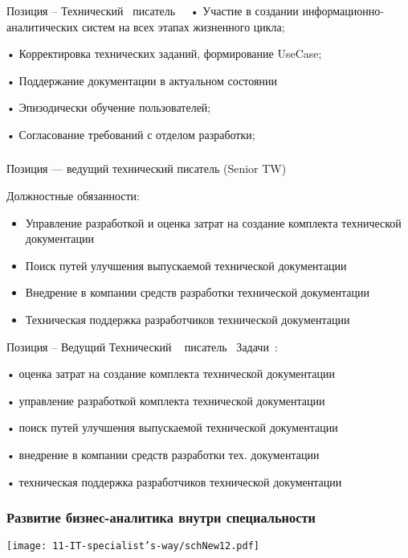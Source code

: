 \documentclass{../industrial-development}
\begin{document}
\lecturenotes

Позиция –  Технический~\cite{hh} писатель~\cite{itcf}~\cite{rab}
•	Участие в создании информационно-аналитических систем на всех этапах жизненного цикла;

•	Корректировка технических заданий, формирование UseCase;

•	Поддержание документации в актуальном состоянии

•	Эпизодически обучение пользователей;

•	Согласование требований с отделом разработки;

\begin{frame} \frametitle{}
  \begin{block}{}
  \alert{Позиция --- ведущий технический писатель (Senior TW) }

Должностные обязанности: 
  \end{block}
  \begin{itemize}
  \item Управление разработкой и оценка затрат на создание комплекта технической документации
  \item Поиск путей улучшения выпускаемой технической документации
  \item Внедрение в компании средств разработки технической документации
 \item 	 Техническая поддержка разработчиков технической документации
  \end{itemize}
\end{frame}

\lecturenotes

Позиция – Ведущий Технический ~\cite{hh} писатель~\cite{itcf}
Задачи~\cite{rab}:

•	оценка затрат на создание комплекта технической документации 

•	управление разработкой комплекта технической документации

•	поиск путей улучшения выпускаемой технической документации 

•	внедрение в компании средств разработки тех. документации 

•	 техническая поддержка разработчиков технической документации


\begin{frame} \frametitle{Развитие бизнес-аналитика внутри специальности }
  \centerline{\texttt{[image: 11-IT-specialist's-way/schNew12.pdf]}}
\end{frame}

\lecturenotes
\end{document}
